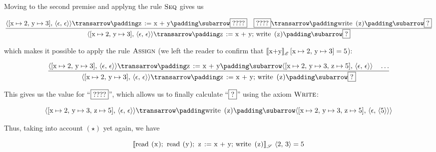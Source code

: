 Moving to the second premise and applyng the rule $\textsc{Seq}$ gives us

\[
\trule{\trans{\inbr{[\llang{x}\mapsto 2,\,\llang{y}\mapsto 3],\,\inbr{\epsilon,\,\epsilon}}}{\llang{z := x + y}}{\fbox{????}}\quad\trans{\fbox{????}}{\llang{write (z)}}{\fbox{?}}}
      {\trans{\inbr{[\llang{x}\mapsto 2,\,\llang{y}\mapsto 3],\,\inbr{\epsilon,\,\epsilon}}}{\llang{z := x + y; write (z)}}{\fbox{?}}}
\]

which makes it possible to apply the rule $\textsc{Assign}$ (we left the reader to confirm that $\sembr{\llang{x+y}}^\ph_\mathscr{E}\,[\llang{x}\mapsto 2,\,\llang{y}\mapsto 3]=5$):

\[
\trule{\trans{\inbr{[\llang{x}\mapsto 2,\,\llang{y}\mapsto 3],\,\inbr{\epsilon,\,\epsilon}}}{\llang{z := x + y}}{\inbr{[\llang{x}\mapsto 2,\,\llang{y}\mapsto 3,\,\llang{z}\mapsto 5],\,\inbr{\epsilon,\,\epsilon}}}\quad
       \dots}
      {\trans{\inbr{[\llang{x}\mapsto 2,\,\llang{y}\mapsto 3],\,\inbr{\epsilon,\,\epsilon}}}{\llang{z := x + y; write (z)}}{\fbox{?}}}
\]

This gives us the value for ``$\fbox{????}$'', which allows us to finally calculate ``$\fbox{?}$'' using the axiom $\textsc{Write}$:

\[
\trans{\inbr{[\llang{x}\mapsto 2,\,\llang{y}\mapsto 3,\,\llang{z}\mapsto 5],\,\inbr{\epsilon,\,\epsilon}}}{\llang{write (z)}}{\inbr{[\llang{x}\mapsto 2,\,\llang{y}\mapsto 3,\,\llang{z}\mapsto 5],\,\inbr{\epsilon,\,\inbr{5}}}}
\]

Thus, taking into account $(\star)$ yet again, we have

\[
\sembr{\llang{read (x); read (y); z := x + y; write (z)}}^\ph_\mathscr{S}\,\inbr{2,\,3}=5
\]

